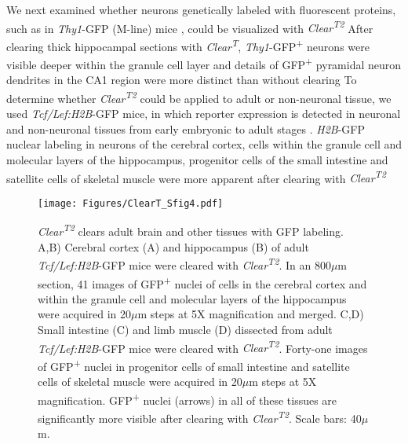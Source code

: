 We next examined whether neurons genetically labeled with fluorescent proteins, such as in \emph{Thy1}-GFP (M-line) mice \cite{feng2000imaging}, could be visualized with \emph{Clear\textsuperscript{T2}} %
After clearing thick hippocampal sections with \emph{Clear\textsuperscript{T}}, \emph{Thy1}-GFP\textsuperscript{+} neurons were visible deeper within the granule cell layer and details of GFP\textsuperscript{+} pyramidal neuron dendrites in the CA1 region were more distinct than without clearing %
To determine whether \emph{Clear\textsuperscript{T2}} could be applied to adult or non-neuronal tissue, we used \emph{Tcf/Lef:H2B}-GFP mice, in which reporter expression is detected in neuronal and non-neuronal tissues from early embryonic to adult stages \cite{ferrer2010sensitive}.
\emph{H2B}-GFP nuclear labeling in neurons of the cerebral cortex, cells within the granule cell and molecular layers of the hippocampus, progenitor cells of the small intestine and satellite cells of skeletal muscle were more apparent after clearing with \emph{Clear\textsuperscript{T2}} %
\begin{figure}[hbtp]
    \begin{center}
        \texttt{[image: Figures/ClearT\_Sfig4.pdf]}
        \caption[\emph{Clear\textsuperscript{T2}} clears adult brain and other tissues with GFP labeling.]
        {\emph{Clear\textsuperscript{T2}} clears adult brain and other tissues with GFP labeling.
        A,B) Cerebral cortex (A) and hippocampus (B) of adult \emph{Tcf/Lef:H2B}-GFP mice were cleared with \emph{Clear\textsuperscript{T2}}.
        In an 800$\mu$m section, 41 images of GFP\textsuperscript{+} nuclei of cells in the cerebral cortex and within the granule cell and molecular layers of the hippocampus were acquired in 20$\mu$m steps at 5X magnification and merged.
        C,D) Small intestine (C) and limb muscle (D) dissected from adult \emph{Tcf/Lef:H2B}-GFP mice were cleared with \emph{Clear\textsuperscript{T2}}.
        Forty-one images of GFP\textsuperscript{+} nuclei in progenitor cells of small intestine and satellite cells of skeletal muscle were acquired in 20$\mu$m steps at 5X magnification.
        GFP\textsuperscript{+} nuclei (arrows) in all of these tissues are significantly more visible after clearing with \emph{Clear\textsuperscript{T2}}.
        Scale bars: 40$\mu$m.
        }
        \label{ClearTSfig4}
    \end{center}
\end{figure}

